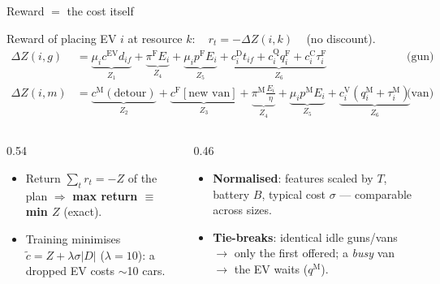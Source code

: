 \documentclass[aspectratio=169,11pt]{beamer}
\begin{document}
\begin{frame}{Reward $=$ the cost itself}
  {\footnotesize
  Reward of placing EV $i$ at resource $k$:\ \ $\boxed{\,r_t=-\Delta Z(i,k)\,}$\ \ (no discount).
  \begin{align*}
    \Delta Z(i,g)&=\underbrace{\mu_i c^{\mathrm{EV}}d_{if}}_{Z_1}+\underbrace{\pi^{\mathrm F}E_i}_{Z_4}+\underbrace{\mu_i p^{\mathrm F}E_i}_{Z_5}+\underbrace{c^{\mathrm D}_i t_{if}+c^{\mathrm Q}_i q^{\mathrm F}_i+c^{\mathrm C}_i\tau^{\mathrm F}_i}_{Z_6} &&\text{(gun)}\\[-1pt]
    \Delta Z(i,m)&=\underbrace{c^{\mathrm M}(\text{detour})}_{Z_2}+\underbrace{c^{\mathrm F}[\text{new van}]}_{Z_3}+\underbrace{\pi^{\mathrm M}\tfrac{E_i}{\eta}}_{Z_4}+\underbrace{\mu_i p^{\mathrm M}E_i}_{Z_5}+\underbrace{c^{\mathrm V}_i(q^{\mathrm M}_i+\tau^{\mathrm M}_i)}_{Z_6} &&\text{(van)}
  \end{align*}
  \begin{columns}[T]
    \begin{column}{0.54\textwidth}
      \begin{itemize}
        \item Return $\sum_t r_t=-Z$ of the plan $\Rightarrow$ \textbf{max return $\equiv$ min $Z$} (exact).
        \item Training minimises $\tilde c=Z+\lambda\sigma|D|$ ($\lambda=10$): a dropped EV costs $\sim$10 cars.
      \end{itemize}
    \end{column}
    \begin{column}{0.46\textwidth}
      \begin{itemize}
        \item \textbf{Normalised}: features scaled by $T$, battery $B$, typical cost $\sigma$ --- comparable across sizes.
        \item \textbf{Tie-breaks}: identical idle guns/vans $\to$ only the first offered; a \emph{busy} van $\to$ the EV waits ($q^{\mathrm M}$).
      \end{itemize}
    \end{column}
  \end{columns}}
\end{frame}
\end{document}
